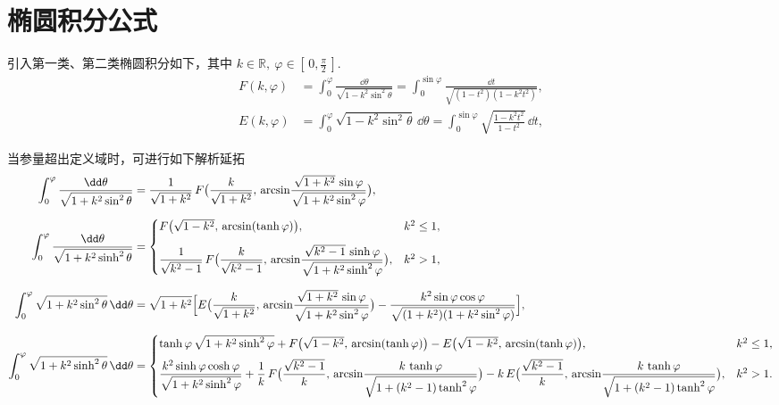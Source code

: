 \label{sec:ellipsoidal_coordinates}

\section{椭圆积分公式}
引入第一类、第二类椭圆积分如下，其中 \(k\in\mathbb{R},\ \varphi\in[\,0,\tfrac\pi2\,]\).
\begin{align*}
	F(k,\varphi)
	 & =\int_{0}^{\varphi}\frac{\dd \theta}{\sqrt{1 - k^2\sin^2\theta}}
	=\int_{0}^{\sin\varphi}\frac{\dd t}{\sqrt{(1 - t^2)(1 - k^2t^2)}},  \\
	E(k,\varphi)
	 & =\int_{0}^{\varphi}\sqrt{1 - k^2\sin^2\theta}\,\dd \theta
	=\int_{0}^{\sin\varphi}\sqrt{\frac{1 - k^2t^2}{1 - t^2}}\,\dd t,
\end{align*}

当参量超出定义域时，可进行如下解析延拓
\small
\begin{align*}
	\int_{0}^{\varphi}\dfrac{\dd \theta}{\sqrt{1 + k^2\sin^2\theta}}
	 & =\dfrac{1}{\sqrt{1+k^2}}\,
	F\bigl(\dfrac{k}{\sqrt{1+k^2}},\,
	\arcsin\!\dfrac{\sqrt{1+k^2}\,\sin\varphi}{\sqrt{1+k^2\sin^2\varphi}}\bigr),                                                       \\[6pt]
	\int_{0}^{\varphi}\dfrac{\dd \theta}{\sqrt{1 + k^2\sinh^2\theta}}
	 & =
	\begin{cases}
		F\bigl(\sqrt{1-k^2},\,\arcsin(\tanh\varphi)\bigr),                             & k^2\le1, \\[2ex]
		\dfrac{1}{\sqrt{k^2-1}}\,
		F\bigl(\dfrac{k}{\sqrt{k^2-1}},\,
		\arcsin\!\dfrac{\sqrt{k^2-1}\,\sinh\varphi}{\sqrt{1+k^2\sinh^2\varphi}}\bigr), & k^2>1,
	\end{cases} \\[8pt]
	\int_{0}^{\varphi}\sqrt{1 + k^2\sin^2\theta}\,\dd \theta
	 & =\sqrt{1+k^2}\Bigl[
		E\bigl(\dfrac{k}{\sqrt{1+k^2}},\,
		\arcsin\!\dfrac{\sqrt{1+k^2}\,\sin\varphi}{\sqrt{1+k^2\sin^2\varphi}}\bigr)
	-\dfrac{k^2\sin\varphi\cos\varphi}{\sqrt{(1+k^2)(1+k^2\sin^2\varphi)}}\Bigr],                                                      \\[8pt]
	\int_{0}^{\varphi}\sqrt{1 + k^2\sinh^2\theta}\,\dd \theta
	 & =
	\begin{cases}
		\tanh\varphi\,\sqrt{1+k^2\sinh^2\varphi}
		+F\bigl(\sqrt{1-k^2},\,\arcsin(\tanh\varphi)\bigr)
		-E\bigl(\sqrt{1-k^2},\,\arcsin(\tanh\varphi)\bigr),              & k^2\le1, \\[6pt]
		\dfrac{k^2\sinh\varphi\cosh\varphi}{\sqrt{1+k^2\sinh^2\varphi}}
		+\dfrac{1}{k}\,
		F\bigl(\dfrac{\sqrt{k^2-1}}{k},\,
		\arcsin\!\dfrac{k\,\tanh\varphi}{\sqrt{1+(k^2-1)\tanh^2\varphi}}\bigr)
		-k\,
		E\bigl(\dfrac{\sqrt{k^2-1}}{k},\,
		\arcsin\!\dfrac{k\,\tanh\varphi}{\sqrt{1+(k^2-1)\tanh^2\varphi}}\bigr), & k^2>1.
	\end{cases}
\end{align*}


